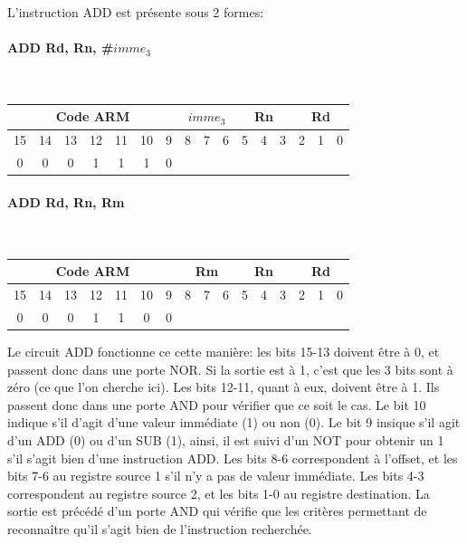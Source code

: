 \documentclass[a4paper]{article} %
\begin{document}
L'instruction ADD est présente sous 2 formes:
\paragraph{ADD Rd, Rn, \#$imme_3$}\mbox{}\\
\begin{tabular}{|ccccccc|ccc|ccc|ccc|}
    \hline
    \multicolumn{7}{|c|}{Code ARM}  & \multicolumn{3}{|c|}{$imme_3$} & \multicolumn{3}{|c|}{Rn} & \multicolumn{3}{|c|}{Rd}\\
    \hline
    15 & 14 & 13 & 12 & 11 & 10 & 9 & 8   & 7   & 6                  & 5 & 4 & 3                & 2   & 1   & 0 \\
    \hline
    0  & 0  & 0  & 1  & 1  & 1 & 0  &  \multicolumn{3}{|c|}{}        &  \multicolumn{3}{|c|}{}  & \multicolumn{3}{|c|}{} \\
    \hline     
    \end{tabular}

\paragraph{ADD Rd, Rn, Rm}\mbox{}\\
\begin{tabular}{|ccccccc|ccc|ccc|ccc|}
    \hline
    \multicolumn{7}{|c|}{Code ARM}  & \multicolumn{3}{|c|}{Rm} & \multicolumn{3}{|c|}{Rn} & \multicolumn{3}{|c|}{Rd}\\
    \hline
    15 & 14 & 13 & 12 & 11 & 10  & 9 & 8   & 7   & 6                 & 5 & 4 & 3                & 2   & 1   & 0 \\
    \hline
    0  & 0  & 0  & 1  & 1  & 0   & 0 &  \multicolumn{3}{|c|}{}     &  \multicolumn{3}{|c|}{}  & \multicolumn{3}{|c|}{} \\
    \hline     
    \end{tabular}    

\vspace{1cm}    
    Le circuit ADD fonctionne ce cette manière: les bits 15-13 doivent être à 0, et passent donc dans une porte NOR. Si la sortie est à 1, c'est que les 3 bits sont à zéro (ce que l'on cherche ici). Les bits 12-11, quant à eux, doivent être à 1. Ils passent donc dans une porte AND pour vérifier que ce soit le cas. Le bit 10 indique s'il d'agit d'une valeur immédiate (1) ou non (0). Le bit 9 insique s'il agit d'un ADD (0) ou d'un SUB (1), ainsi, il est suivi d'un NOT pour obtenir un 1 s'il s'agit bien d'une instruction ADD. Les bits 8-6 correspondent à l'offset, et les bits 7-6 au registre source 1 s'il n'y a pas de valeur immédiate. Les bits 4-3 correspondent au registre source 2, et les bits 1-0 au registre destination.
    La sortie est précédé d'un porte AND qui vérifie que les critères permettant de reconnaître qu'il s'agit bien de l'instruction recherchée.
    
\end{document}
